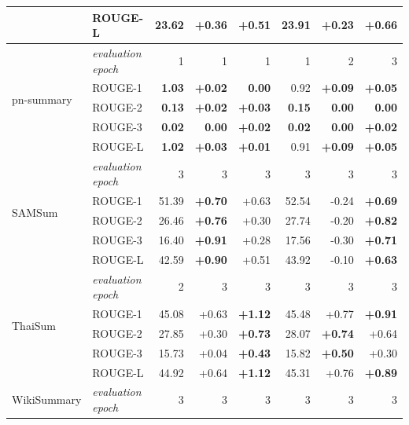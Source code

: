 \documentclass{article}
\theoremstyle{plain}
\theoremstyle{definition}
\theoremstyle{remark}
\begin{document}
\begin{table}[b!]
{\begin{tabular}{llrrrrrr}
 &    ROUGE-L & 23.62 &     +0.36 &     \textbf{+0.51} &  23.91 &         +0.23 &         \textbf{+0.66} \\
 \midrule
\multirow{5}{*}{pn-summary \citep{Farahani_2021} } 
 & \textit{evaluation epoch} &  1 &  1 &  1 &  1 &  2 &  3 \\
 &    ROUGE-1 &  \textbf{1.03} &     \textbf{+0.02} &     \textbf{0.00} &   0.92 &         \textbf{+0.09} &         \textbf{+0.05} \\
 &    ROUGE-2 &  \textbf{0.13} &     \textbf{+0.02} &     \textbf{+0.03} &   \textbf{0.15} &         \textbf{0.00} &         \textbf{0.00} \\
 &    ROUGE-3 &  \textbf{0.02} &      \textbf{0.00} &     \textbf{+0.02} &   \textbf{0.02} &         \textbf{0.00} &         \textbf{+0.02} \\
 &    ROUGE-L &  \textbf{1.02} &     \textbf{+0.03} &     \textbf{+0.01} &   0.91 &         \textbf{+0.09} &         \textbf{+0.05} \\
 \midrule
\multirow{5}{*}{SAMSum \citep{Gliwa_2019}} 
 & \textit{evaluation epoch} & 3 & 3 & 3 &  3 &  3 &  3 \\
 &    ROUGE-1 & 51.39 &     \textbf{+0.70} &     +0.63 &  52.54 &        -0.24 &         \textbf{+0.69}  \\
 &    ROUGE-2 & 26.46 &     \textbf{+0.76} &     +0.30 &  27.74 &        -0.20 &         \textbf{+0.82} \\
 &    ROUGE-3 & 16.40 &     \textbf{+0.91} &     +0.28 &  17.56 &        -0.30 &         \textbf{+0.71} \\
 &    ROUGE-L & 42.59 &     \textbf{+0.90} &     +0.51 &  43.92 &        -0.10 &         \textbf{+0.63} \\
 \midrule
\multirow{5}{*}{ThaiSum \citep{chumpolsathien_2020}} 
 & \textit{evaluation epoch} & 2 & 3 & 3 &  3 &  3 &  3 \\
 &    ROUGE-1 & 45.08 &     +0.63 &     \textbf{+1.12} &  45.48 &         +0.77 &         \textbf{+0.91} \\
 &    ROUGE-2 & 27.85 &     +0.30 &     \textbf{+0.73} &  28.07 &         \textbf{+0.74} &         +0.64 \\
 &    ROUGE-3 & 15.73 &     +0.04 &     \textbf{+0.43} &  15.82 &         \textbf{+0.50} &         +0.30 \\
 &    ROUGE-L & 44.92 &     +0.64 &     \textbf{+1.12} &  45.31 &         +0.76 &         \textbf{+0.89} \\
 \midrule
\multirow{5}{*}{WikiSummary \citep{Bert2BertWikiSummaryPersian}} 
 & \textit{evaluation epoch} & 3 & 3 & 3 &  3 &  3 &  3 \\

\end{tabular}}
\end{table}
\end{document}
